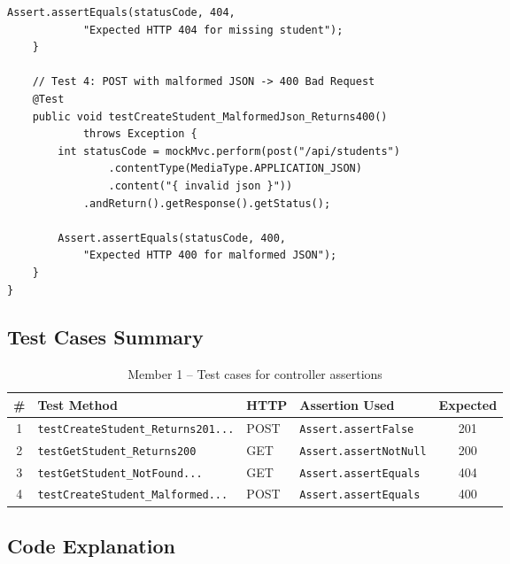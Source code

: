 \documentclass[12pt,a4paper]{article}
\begin{document}
\begin{lstlisting}[style=javastyle, caption={\texttt{StudentControllerTest.java} -- Member 1's assertion tests}]
        Assert.assertEquals(statusCode, 404,
            "Expected HTTP 404 for missing student");
    }

    // Test 4: POST with malformed JSON -> 400 Bad Request
    @Test
    public void testCreateStudent_MalformedJson_Returns400()
            throws Exception {
        int statusCode = mockMvc.perform(post("/api/students")
                .contentType(MediaType.APPLICATION_JSON)
                .content("{ invalid json }"))
            .andReturn().getResponse().getStatus();

        Assert.assertEquals(statusCode, 400,
            "Expected HTTP 400 for malformed JSON");
    }
}
\end{lstlisting}

\subsection{Test Cases Summary}

\begin{table}[h!]
\centering
\begin{tabular}{clllc}
    \toprule
    \textbf{\#} & \textbf{Test Method} & \textbf{HTTP} & \textbf{Assertion Used} & \textbf{Expected} \\
    \midrule
    1 & \texttt{testCreateStudent\_Returns201...} & POST & \texttt{Assert.assertFalse} & 201 \\
    2 & \texttt{testGetStudent\_Returns200} & GET & \texttt{Assert.assertNotNull} & 200 \\
    3 & \texttt{testGetStudent\_NotFound...} & GET & \texttt{Assert.assertEquals} & 404 \\
    4 & \texttt{testCreateStudent\_Malformed...} & POST & \texttt{Assert.assertEquals} & 400 \\
    \bottomrule
\end{tabular}
\caption{Member 1 -- Test cases for controller assertions}
\end{table}

\subsection{Code Explanation}
\end{document}
